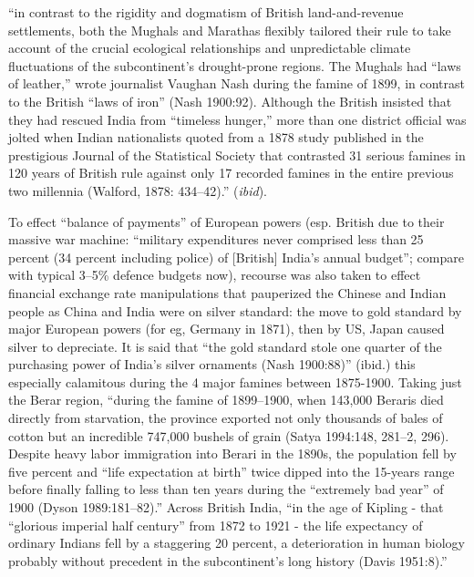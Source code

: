\begin{myquote}
“in contrast to the rigidity and dogmatism of British land-and-revenue settlements, both the Mughals and Marathas flexibly tailored their rule to take account of the crucial ecological relationships and unpredictable climate fluctuations of the subcontinent’s drought-prone regions. The Mughals had “laws of leather,” wrote journalist Vaughan Nash during the famine of 1899, in contrast to the British “laws of iron” (Nash 1900:92). Although the British insisted that they had rescued India from “timeless hunger,” more than one district official was jolted when Indian nationalists quoted from a 1878 study published in the prestigious Journal of the Statistical Society that contrasted 31 serious famines in 120 years of British rule against only 17 recorded famines in the entire previous two millennia (Walford, 1878: 434–42).” ({\sl ibid}). 
\end{myquote}
To effect “balance of payments” of European powers (esp. British due to their massive war machine: “military expenditures never comprised less than 25 percent (34 percent including police) of [British] India’s annual budget”; compare with typical 3--5\% defence budgets now), recourse was also taken to effect financial exchange rate manipulations that pauperized the Chinese and Indian people as China and India were on silver standard: the move to gold standard by major European powers (for eg, Germany in 1871), then by US, Japan caused silver to depreciate. It is said that “the gold standard stole one quarter of the purchasing power of India’s silver ornaments (Nash 1900:88)” (ibid.) this especially calamitous during the 4 major famines between 1875-1900. Taking just the Berar region, “during the famine of 1899–1900, when 143,000 Beraris died directly from starvation, the province exported not only thousands of bales of cotton but an incredible 747,000 bushels of grain (Satya 1994:148, 281–2, 296). Despite heavy labor immigration into Berari in the 1890s, the population fell by five percent and “life expectation at birth” twice dipped into the 15-years range before finally falling to less than ten years during the “extremely bad year” of 1900 (Dyson 1989:181–82).” Across British India, “in the age of Kipling - that “glorious imperial half century” from 1872 to 1921 - the life expectancy of ordinary Indians fell by a staggering 20 percent, a deterioration in human biology probably without precedent in the subcontinent’s long history (Davis 1951:8).” 

